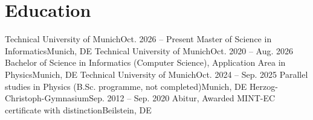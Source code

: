\section{Education}
  \resumeSubHeadingListStart
    \resumeSubheading
      {Technical University of Munich}{Oct. 2026 -- Present}
      {Master of Science in Informatics}{Munich, DE}
    \resumeSubheading
      {Technical University of Munich}{Oct. 2020 -- Aug. 2026}
      {Bachelor of Science in Informatics (Computer Science), Application Area in Physics}{Munich, DE}
    \resumeSubheading
      {Technical University of Munich}{Oct. 2024 -- Sep. 2025}
      {Parallel studies in Physics (B.Sc. programme, not completed)}{Munich, DE}
    \resumeSubheading
      {Herzog-Christoph-Gymnasium}{Sep. 2012 -- Sep. 2020}
      {Abitur, Awarded MINT-EC certificate with distinction}{Beilstein, DE}
  \resumeSubHeadingListEnd
